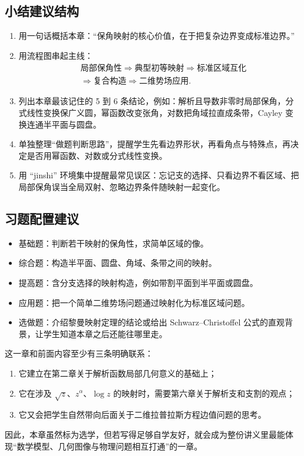 \subsection*{小结建议结构}
\begin{enumerate}
    \item 用一句话概括本章：``保角映射的核心价值，在于把复杂边界变成标准边界。''
    \item 用流程图串起主线：
    \[
        \begin{aligned}
            &\text{局部保角性}
            \Longrightarrow
            \text{典型初等映射}
            \Longrightarrow
            \text{标准区域互化} \\
            &\Longrightarrow
            \text{复合构造}
            \Longrightarrow
            \text{二维势场应用}.
        \end{aligned}
    \]
    \item 列出本章最该记住的 5 到 6 条结论，例如：解析且导数非零时局部保角，分式线性变换保广义圆，幂函数改变张角，对数把角域拉直成条带，Cayley 变换连通半平面与圆盘。
    \item 单独整理``做题判断思路''，提醒学生先看边界形状，再看角点与特殊点，再决定是否用幂函数、对数或分式线性变换。
    \item 用 ``jinshi'' 环境集中提醒最常见误区：忘记支的选择、只看边界不看区域、把局部保角误当全局双射、忽略边界条件随映射一起变化。
\end{enumerate}

\subsection*{习题配置建议}
\begin{itemize}
    \item 基础题：判断若干映射的保角性，求简单区域的像。
    \item 综合题：构造半平面、圆盘、角域、条带之间的映射。
    \item 提高题：含分支选择的映射构造，例如带割平面到半平面或圆盘。
    \item 应用题：把一个简单二维势场问题通过映射化为标准区域问题。
    \item 选做题：介绍黎曼映射定理的结论或给出 Schwarz--Christoffel 公式的直观背景，让学生知道本章之后还能往哪里走。
\end{itemize}

\begin{tishi}[与前后章节的联系]
这一章和前面内容至少有三条明确联系：
\begin{enumerate}
    \item 它建立在第二章关于解析函数局部几何意义的基础上；
    \item 它在涉及 $\sqrt{z}$、$z^\alpha$、$\log z$ 的映射时，需要第六章关于解析支和支割的观点；
    \item 它又会把学生自然带向后面关于二维拉普拉斯方程边值问题的思考。
\end{enumerate}

因此，本章虽然标为选学，但若写得足够自学友好，就会成为整份讲义里最能体现``数学模型、几何图像与物理问题相互打通''的一章。
\end{tishi}
